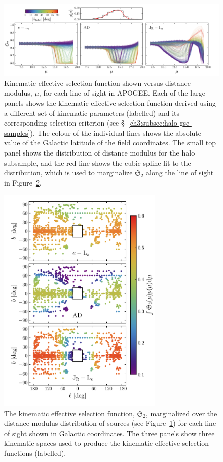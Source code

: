\begin{figure}
    \centering
    \includegraphics[width=\textwidth]{figure/ch3/ksf_dmod_fields.pdf}
    \caption{Kinematic effective selection function shown versus distance modulus, $\mu$, for each line of sight in APOGEE. Each of the large panels shows the kinematic effective selection function derived using a different set of kinematic parameters (labelled) and its corresponding selection criterion (see \S~\ref{ch3:subsec:halo-gse-samples}). The colour of the individual lines shows the absolute value of the Galactic latitude of the field coordinates. The small top panel shows the distribution of distance modulus for the halo subsample, and the red line shows the cubic spline fit to the distribution, which is used to marginalize $\mathfrak{S}_\mathrm{2}$ along the line of sight in Figure~\ref{ch3:fig:ksf_lb_dmod_marginalized}.}
    \label{ch3:fig:ksf_dmod_fields}
\end{figure}

\begin{figure}
    \centering
    \includegraphics[width=0.7\textwidth]{figure/ch3/ksf_lb_dmod_marginalized.pdf}
    \caption{The kinematic effective selection function, $\mathfrak{S}_\mathrm{2}$, marginalized over the distance modulus distribution of sources (see Figure~\ref{ch3:fig:ksf_dmod_fields}) for each line of sight shown in Galactic coordinates. The three panels show three kinematic spaces used to produce the kinematic effective selection functions (labelled).}
    \label{ch3:fig:ksf_lb_dmod_marginalized}
\end{figure}

